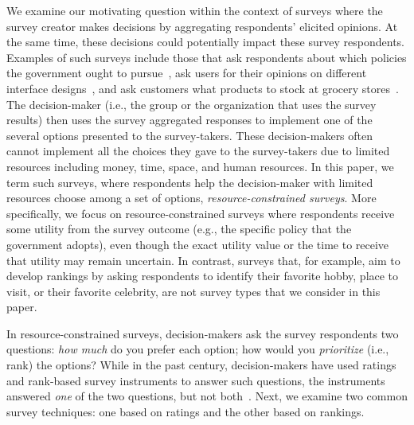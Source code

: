 {{We examine our motivating question within the context of surveys where the survey creator makes decisions by aggregating respondents' elicited opinions. At the same time, these decisions could potentially impact these survey respondents. Examples of such surveys include those that ask respondents about which policies the government ought to pursue~\cite{pew_spending}, ask users for their opinions on different interface designs~\cite{ledo2018evaluation}, and ask customers what products to stock at grocery stores~\cite{nielsen}. The decision-maker (i.e., the group or the organization that uses the survey results) then uses the survey aggregated responses to implement one of the several options presented to the survey-takers. These decision-makers often cannot implement all the choices they gave to the survey-takers due to limited resources including money, time, space, and human resources. In this paper, we term such surveys, where respondents help the decision-maker with limited resources choose among a set of options, \textit{resource-constrained surveys}. More specifically, we focus on resource-constrained surveys where respondents receive some utility from the survey outcome (e.g., the specific policy that the government adopts), even though the exact  utility value or the time to receive that utility may remain uncertain. In contrast, surveys that, for example, aim to develop rankings by asking respondents to identify their favorite hobby, place to visit, or their favorite celebrity, are not survey types that we consider in this paper. 

In resource-constrained surveys, decision-makers ask the survey respondents two questions: \textit{how much} do you prefer each option; how would you \textit{prioritize} (i.e., rank) the options? While in the past century, decision-makers have used ratings and rank-based survey instruments to answer such questions, the instruments answered \emph{one} of the two questions, but not both~\cite{moors2016two}.  Next, we examine two common survey techniques: one based on ratings and the other based on rankings.

}}
